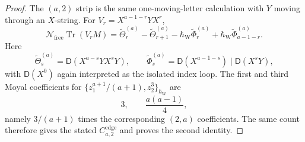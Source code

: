 \begin{proof}
  The \((a,2)\) strip is the same one-moving-letter calculation with
  \(Y\) moving through an \(X\)-string.  For
  \(V_r=X^{a-1-r}YX^r\),
  \[
    \mathcal N_{\mathrm{free}}\operatorname{Tr}(V_rM)
    =
    \widetilde\Theta_r^{(a)}-\widetilde\Theta_{r+1}^{(a)}
    -\hbar_{\mathrm{W}}\widetilde\Phi_r^{(a)}
    +\hbar_{\mathrm{W}}\widetilde\Phi_{a-1-r}^{(a)}.
  \]
  Here
  \[
    \widetilde\Theta_s^{(a)}
      =\mathsf D(X^{a-s}YX^sY),
    \qquad
    \widetilde\Phi_s^{(a)}
      =\mathsf D(X^{a-1-s})\mid\mathsf D(X^sY),
  \]
  with \(\mathsf D(X^0)\) again interpreted as the isolated index loop.
  The first and third Moyal coefficients for
  \(\{z_1^{a+1}/(a+1),z_2^3\}_{\hbar_{\mathrm{W}}}\) are
  \[
    3,\qquad \frac{a(a-1)}4,
  \]
  namely \(3/(a+1)\) times the corresponding \((2,a)\) coefficients.
  The same count therefore gives the stated
  \(C^{\mathrm{edge}}_{a,2}\) and proves the second identity.
\end{proof}

